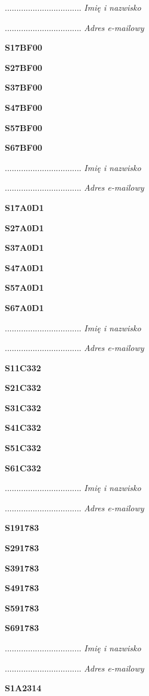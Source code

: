 .................................
\textit{Imię i nazwisko}

.................................
\textit{Adres e-mailowy}

\Large \textbf{S17BF00}

\Large \textbf{S27BF00}

\Large \textbf{S37BF00}

\Large \textbf{S47BF00}

\Large \textbf{S57BF00}

\Large \textbf{S67BF00}

.................................
\textit{Imię i nazwisko}

.................................
\textit{Adres e-mailowy}

\Large \textbf{S17A0D1}

\Large \textbf{S27A0D1}

\Large \textbf{S37A0D1}

\Large \textbf{S47A0D1}

\Large \textbf{S57A0D1}

\Large \textbf{S67A0D1}

.................................
\textit{Imię i nazwisko}

.................................
\textit{Adres e-mailowy}

\Large \textbf{S11C332}

\Large \textbf{S21C332}

\Large \textbf{S31C332}

\Large \textbf{S41C332}

\Large \textbf{S51C332}

\Large \textbf{S61C332}

.................................
\textit{Imię i nazwisko}

.................................
\textit{Adres e-mailowy}

\Large \textbf{S191783}

\Large \textbf{S291783}

\Large \textbf{S391783}

\Large \textbf{S491783}

\Large \textbf{S591783}

\Large \textbf{S691783}

.................................
\textit{Imię i nazwisko}

.................................
\textit{Adres e-mailowy}

\Large \textbf{S1A2314}

